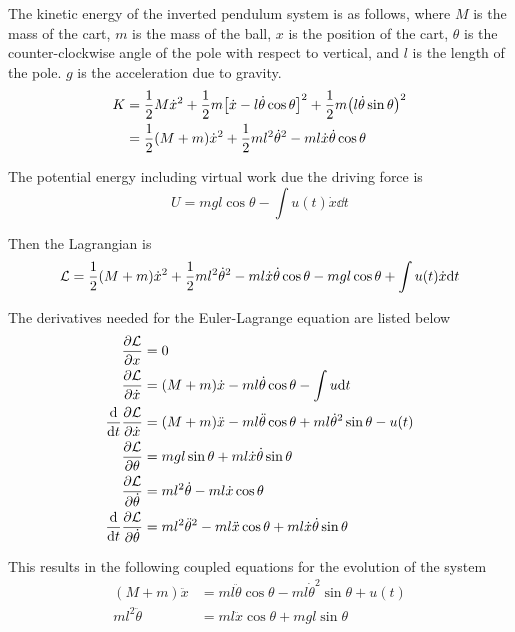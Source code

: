 \documentclass[a4paper,12pt]{article}
\begin{document}
The kinetic energy of the inverted pendulum system is as follows, where $M$ is
the mass of the cart, $m$ is the mass of the ball, $x$ is the position of the
cart, $\theta$ is the counter-clockwise angle of the pole with respect to
vertical, and $l$ is the length of the pole. $g$ is the acceleration due to
gravity.
\begin{align}
    K &= \frac{1}{2} M \dot{x}^2 \nonumber
      + \frac{1}{2} m \qty[ \dot{x} - l \dot{\theta} \cos \theta]^2
      + \frac{1}{2} m \qty(l \dot{\theta} \sin \theta)^2 \\ 
      &= \frac{1}{2} \qty(M+m) \dot{x}^2 + \frac{1}{2} m l^2 \dot{\theta}^2
      - ml \dot{x} \dot{\theta} \cos \theta
\end{align}

The potential energy including virtual work due the driving force is
\begin{equation}
    U = mgl \cos \theta - \int u(t) \dot{x} \dd t
\end{equation}

Then the Lagrangian is
\begin{equation}
    \mathcal{L}
        = \frac{1}{2} \qty(M+m) \dot{x}^2
        + \frac{1}{2} m l^2 \dot{\theta}^2
        - ml \dot{x} \dot{\theta} \cos \theta
        - mgl \cos \theta + \int u(t) \dot{x} \dd t
\end{equation}

The derivatives needed for the Euler-Lagrange equation are listed below
\begin{align*}
    \pdv{\mathcal{L}}{x} &= 0 \\
    \pdv{\mathcal{L}}{\dot{x}} &= (M+m)\dot{x} - ml \dot{\theta} \cos \theta
        - \int u \dd t \\
    \dv{t}\pdv{\mathcal{L}}{\dot{x}} &= 
        (M+m) \ddot{x}
        - ml \ddot{\theta} \cos \theta
        + ml \dot{\theta}^2 \sin\theta
        - u(t) \\
    \pdv{\mathcal{L}}{\theta} &= 
        mgl \sin\theta
        + ml\dot{x} \dot{\theta} \sin\theta \\
    \pdv{\mathcal{L}}{\dot{\theta}} &= 
        ml^2 \dot{\theta} - ml \dot{x} \cos \theta \\
    \dv{t} \pdv{\mathcal{L}}{\dot{\theta}} &= 
        ml^2 \ddot{\theta}^2
        - ml \ddot{x} \cos \theta
        + ml \dot{x}\dot{\theta} \sin \theta
\end{align*}

This results in the following coupled equations for the evolution of the system
\begin{align}
    (M+m) \ddot{x} &= ml \ddot{\theta} \cos \theta
        - ml \dot{\theta}^2 \sin\theta + u(t) \\
    ml^2 \ddot{\theta} &= ml \ddot{x} \cos \theta + mgl\sin\theta
\end{align}
\end{document}
